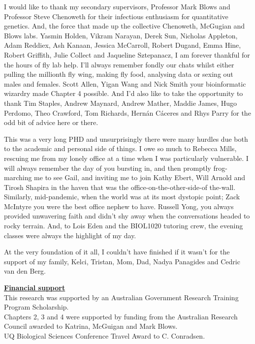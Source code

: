 I would like to thank my secondary supervisors, Professor Mark Blows and Professor Steve Chenoweth for their infectious enthusiasm for quantitative genetics. And, the force that made up the collective Chenoweth, McGugian and Blows labs. Yasmin Holden, Vikram Narayan, Derek Sun, Nicholas Appleton, Adam Reddiex, Ash Kanaan, Jessica McCarroll, Robert Dugand, Emma Hine, Robert Griffith, Julie Collect and Jaqueline Sztepanacz, I am forever thankful for the hours of fly lab help. I'll always remember fondly our chats whilst either pulling the millionth fly wing, making fly food, analysing data or sexing out males and females. Scott Allen, Yigan Wang and Nick Smith your bioinformatic wizardry made Chapter 4 possible. And I'd also like to take the opportunity to thank Tim Staples, Andrew Maynard, Andrew Mather, Maddie James, Hugo Perdomo, Theo Crawford, Tom Richards, Hern\'an C\'aceres and Rhys Parry for the odd bit of advice here or there. \par

This was a very long PHD and unsurprisingly there were many hurdles due both to the academic and personal side of things. I owe so much to Rebecca Mills, rescuing me from my lonely office at a time when I was particularly vulnerable. I will always remember the day of you bursting in, and then promptly frog-marching me to see Gail, and inviting me to join Kathy Ebert, Will Arnold and Tirosh Shapira in the haven that was the office-on-the-other-side-of the-wall. Similarly, mid-pandemic, when the world was at its most dystopic point; Zack McIntyre you were the best office nephew to have.  Russell Yong, you always provided unwavering faith and didn't shy away when the conversations headed to rocky terrain. And, to Lois Eden and the BIOL1020 tutoring crew, the evening classes were always the highlight of my day.\par

At the very foundation of it all, I couldn't have finished if it wasn't for the support of my family, Kelci, Tristan, Mom, Dad, Nadya Panagides and Cedric van den Berg. 

\newpage

\noindent\textbf{\underline{Financial support}}\\
\bigskip
\noindent 
This research was supported by an Australian Government Research Training Program Scholarship.\\
\bigskip
\noindent 
Chapters 2, 3 and 4 were supported by funding from the Australian Research Council awarded to
Katrina, McGuigan and Mark Blows.\\
\bigskip
\noindent
UQ Biological Sciences Conference Travel Award to C. Conradsen.\\
\vspace{36pt}

